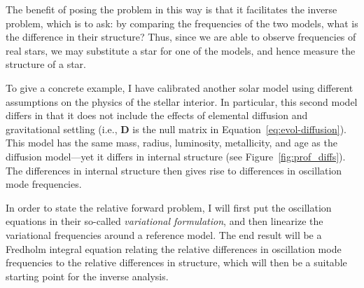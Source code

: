The benefit of posing the problem in this way is that it facilitates the inverse problem, which is to ask: by comparing the frequencies of the two models, what is the difference in their structure? 
Thus, since we are able to observe frequencies of real stars, we may substitute a star for one of the models, and hence measure the structure of a star. 

To give a concrete example, I have calibrated another solar model using different assumptions on the physics of the stellar interior. 
In particular, this second model differs in that it does not include the effects of elemental diffusion and gravitational settling (i.e., $\mathbf{D}$ is the null matrix in Equation~\ref{eq:evol-diffusion}). 
This model has the same mass, radius, luminosity, metallicity, and age as the diffusion model---yet it differs in internal structure (see Figure~\ref{fig:prof_diffs}). %
The differences in internal structure then gives rise to differences in oscillation mode frequencies. %

In order to state the relative forward problem, I will first put the oscillation equations in their so-called \emph{variational formulation}, and then %
linearize the variational frequencies around a reference model. 
The end result will be a Fredholm integral equation relating the relative differences in oscillation mode frequencies to the relative differences in structure, which will then be a suitable starting point for the inverse analysis. 


